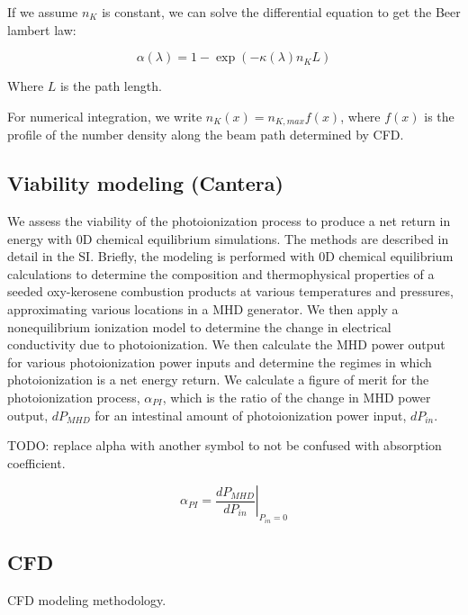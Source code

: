 If we assume $n_K$ is constant, we can solve the differential equation to get the Beer lambert law:

\begin{equation}
    \alpha(\lambda) = 1 - \exp(-\kappa(\lambda) n_K L)
\end{equation}

Where $L$ is the path length.

For numerical integration, we write $n_K(x) = n_{K,max} f(x)$, where $f(x)$ is the profile of the number density along the beam path determined by CFD. 




\subsection{Viability modeling (Cantera)}

We assess the viability of the photoionization process to produce a net return in energy with 0D chemical equilibrium simulations. The methods are described in detail in the SI. Briefly, the modeling is performed with 0D chemical equilibrium calculations to determine the composition and thermophysical properties of a seeded oxy-kerosene combustion products at various temperatures and pressures, approximating various locations in a MHD generator. We then apply a nonequilibrium ionization model to determine the change in electrical conductivity due to photoionization. We then calculate the MHD power output for various photoionization power inputs and determine the regimes in which photoionization is a net energy return. We calculate a figure of merit for the photoionization process, $\alpha_{PI}$, which is the ratio of the change in MHD power output, $dP_{MHD}$ for an intestinal amount of photoionization power input, $dP_{in}$. 


TODO: replace alpha with another symbol to not be confused with absorption coefficient.


\begin{equation}
\alpha_{PI} = \left. \frac{{dP}_{MHD}}{{dP}_{in}} \right|_{P_{in}=0}
\end{equation}

\subsection{CFD}

CFD modeling methodology. 


